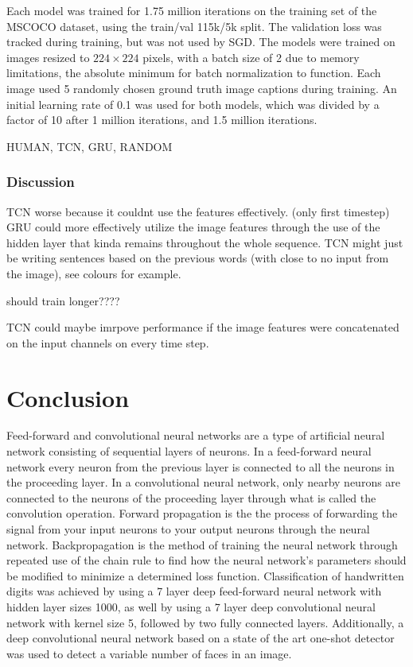 \documentclass[a4paper, twoside]{article}
\begin{document}
Each model was trained for 1.75 million iterations on the training set of the MSCOCO dataset, using the train/val 115k/5k split. The validation loss was tracked during training, but was not used by SGD. The models were trained on images resized to $224 \times 224$ pixels, with a batch size of 2 due to memory limitations, the absolute minimum for batch normalization to function. Each image used 5 randomly chosen ground truth image captions during training. An initial learning rate of 0.1 was used for both models, which was divided by a factor of 10 after 1 million iterations, and 1.5 million iterations.

HUMAN, TCN, GRU, RANDOM

\subsubsection{Discussion}
TCN worse because it couldnt use the features effectively. (only first timestep)
GRU could more effectively utilize the image features through the use of the hidden layer that kinda remains throughout the whole sequence. TCN might just be writing sentences based on the previous words (with close to no input from the image), see colours for example.

should train longer????

TCN could maybe imrpove performance if the image features were concatenated on the input channels on every time step.

\section{Conclusion} 
Feed-forward and convolutional neural networks are a type of artificial neural network consisting of sequential layers of neurons. In a feed-forward neural network every neuron from the previous layer is connected to all the neurons in the proceeding layer. In a convolutional neural network, only nearby neurons are connected to the neurons of the proceeding layer through what is called the convolution operation. Forward propagation is the the process of forwarding the signal from your input neurons to your output neurons through the neural network. Backpropagation is the method of training the neural network through repeated use of the chain rule to find how the neural network's parameters should be modified to minimize a determined loss function. Classification of handwritten
digits was achieved by using a 7 layer deep feed-forward neural network with hidden layer sizes 1000, as well by using a 7 layer deep convolutional neural network with kernel size 5, followed by two fully connected layers. Additionally, a deep convolutional neural network based on a state of the art one-shot detector was used to detect a variable number of faces in an image.
\end{document}
